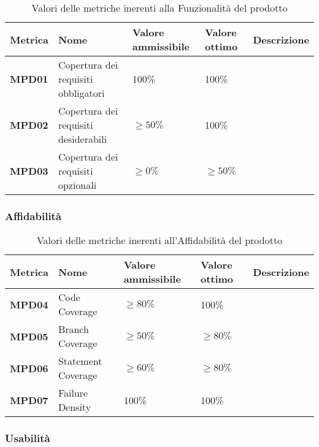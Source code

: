 \documentclass[italian,12pt]{article} %
\begin{document}
\begin{table}[h!]
	\centering
	\begin{tabularx}{\textwidth}{|X|X|X|X|X|} 	 
		\hline
		\textbf{Metrica} 	& \textbf{Nome} & \textbf{Valore ammissibile} & \textbf{Valore ottimo} & \textbf{Descrizione}\\  	 
		\hline
		\textbf{MPD01} & Copertura dei requisiti obbligatori & 100\%  & 100\% &\\
		\hline
		\textbf{MPD02} & Copertura dei requisiti desiderabili & $\geq 50\% $  & 100\% &\\ 
		\hline
		\textbf{MPD03} & Copertura dei requisiti opzionali & $\geq 0\% $ & $\geq 50\% $ &\\ 
		\hline
	\end{tabularx}
	\caption{ Valori delle metriche inerenti alla Funzionalità del prodotto}
	\label{table:7}
	\end{table}

\subsubsection{Affidabilità}

\begin{table}[h!]
	\centering
	\begin{tabularx}{\textwidth}{|X|X|X|X|X|} 	 
		\hline
		\textbf{Metrica} 	& \textbf{Nome} & \textbf{Valore ammissibile} & \textbf{Valore ottimo} & \textbf{Descrizione}\\  	 
		\hline
		\textbf{MPD04} & Code Coverage & $\geq 80\% $  & 100\% &\\
		\hline
		\textbf{MPD05} & Branch Coverage & $\geq 50\% $  & $\geq 80\% $ &\\ 
		\hline
		\textbf{MPD06} & Statement Coverage & $\geq 60\% $ & $\geq 80\% $ &\\ 
		\hline
		\textbf{MPD07} & Failure Density & 100\%  & 100\%  &\\ 
		\hline
	\end{tabularx}
	\caption{ Valori delle metriche inerenti all'Affidabilità del prodotto}
	\label{table:8}
	\end{table}


\subsubsection{Usabilità}
\end{document}
